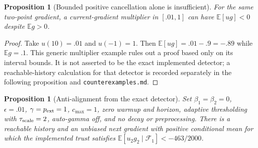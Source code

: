 \documentclass[11pt,a4paper]{article}
\newtheorem{proposition}[theorem]{Proposition}
\theoremstyle{definition}
\theoremstyle{remark}
\newcommand{\E}{\mathbb E}
\begin{document}
\begin{proposition}[Bounded positive cancellation alone is insufficient]\label{prop:scalarbias}
For the same two-point gradient, a current-gradient multiplier in $[.01,1]$
can have $\E[ug]<0$ despite $\E g>0$.
\end{proposition}
\begin{proof}
Take $u(10)=.01$ and $u(-1)=1$. Then $\E[ug]=.01-.9=-.89$ while
$\E g=.1$. This generic multiplier example rules out a proof based only on
its interval bounds. It is not asserted to be the exact implemented detector;
a reachable-history calculation for that detector is recorded separately in
the following proposition and \texttt{counterexamples.md}.
\end{proof}

\begin{proposition}[Anti-alignment from the exact detector]\label{prop:detectorbias}
Set $\beta_1=\beta_2=0$, $\epsilon=.01$, $\gamma=p_{\rm ext}=1$,
$c_{\max}=1$, zero warmup and horizon, adaptive thresholding with
$\tau_{\rm scale}=2$, auto-gamma off, and no decay or preprocessing.
There is a reachable history and an unbiased next gradient with positive
conditional mean for which the implemented trust satisfies
$\E[u_2g_2\mid\mathcal F_1]<-463/2000$.
\end{proposition}
\end{document}
